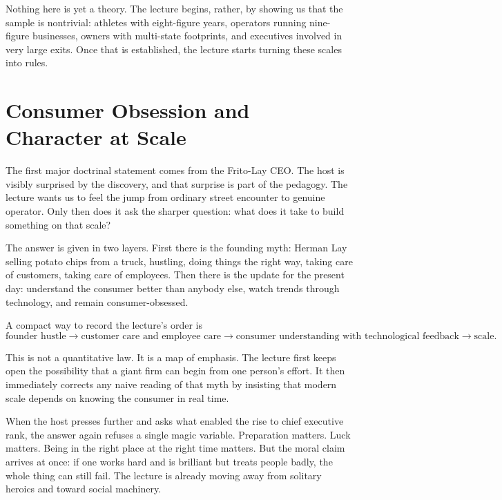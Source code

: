 Nothing here is yet a theory. The lecture begins, rather, by showing us that the sample is nontrivial: athletes with eight-figure years, operators running nine-figure businesses, owners with multi-state footprints, and executives involved in very large exits. Once that is established, the lecture starts turning these scales into rules.

\section{Consumer Obsession and Character at Scale}

The first major doctrinal statement comes from the Frito-Lay CEO. The host is visibly surprised by the discovery, and that surprise is part of the pedagogy. The lecture wants us to feel the jump from ordinary street encounter to genuine operator. Only then does it ask the sharper question: what does it take to build something on that scale?

The answer is given in two layers. First there is the founding myth: Herman Lay selling potato chips from a truck, hustling, doing things the right way, taking care of customers, taking care of employees. Then there is the update for the present day: understand the consumer better than anybody else, watch trends through technology, and remain consumer-obsessed.

A compact way to record the lecture's order is
\begin{equation}
\text{founder hustle}
\longrightarrow
\text{customer care and employee care}
\longrightarrow
\text{consumer understanding with technological feedback}
\longrightarrow
\text{scale}.
\end{equation}

This is not a quantitative law. It is a map of emphasis. The lecture first keeps open the possibility that a giant firm can begin from one person's effort. It then immediately corrects any naive reading of that myth by insisting that modern scale depends on knowing the consumer in real time.

When the host presses further and asks what enabled the rise to chief executive rank, the answer again refuses a single magic variable. Preparation matters. Luck matters. Being in the right place at the right time matters. But the moral claim arrives at once: if one works hard and is brilliant but treats people badly, the whole thing can still fail. The lecture is already moving away from solitary heroics and toward social machinery.

